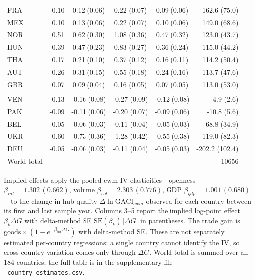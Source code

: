 \begin{table}[t]
\begin{threeparttable}
\begin{tabular}{lrcccr}
FRA & 0.10 & 0.12 (0.06) & 0.22 (0.07) & 0.09 (0.06) & 162.6 (75.0) \\
MEX & 0.10 & 0.13 (0.06) & 0.22 (0.07) & 0.10 (0.06) & 149.0 (68.6) \\
NOR & 0.51 & 0.62 (0.30) & 1.08 (0.36) & 0.47 (0.32) & 123.0 (43.7) \\
HUN & 0.39 & 0.47 (0.23) & 0.83 (0.27) & 0.36 (0.24) & 115.0 (44.2) \\
THA & 0.17 & 0.21 (0.10) & 0.37 (0.12) & 0.16 (0.11) & 114.2 (50.4) \\
AUT & 0.26 & 0.31 (0.15) & 0.55 (0.18) & 0.24 (0.16) & 113.7 (47.6) \\
GBR & 0.07 & 0.09 (0.04) & 0.16 (0.05) & 0.07 (0.05) & 113.0 (53.0) \\
\addlinespace
\multicolumn{6}{l}{\emph{Connectivity decliners (bottom 5)}}\\
VEN & -0.13 & -0.16 (0.08) & -0.27 (0.09) & -0.12 (0.08) & -4.9 (2.6) \\
PAK & -0.09 & -0.11 (0.06) & -0.20 (0.07) & -0.09 (0.06) & -10.8 (5.6) \\
BEL & -0.05 & -0.06 (0.03) & -0.11 (0.04) & -0.05 (0.03) & -68.8 (34.9) \\
UKR & -0.60 & -0.73 (0.36) & -1.28 (0.42) & -0.55 (0.38) & -119.0 (82.3) \\
DEU & -0.05 & -0.06 (0.03) & -0.11 (0.04) & -0.05 (0.03) & -202.2 (102.4) \\
\midrule
World total & --- & --- & --- & --- & 10656 \\
\bottomrule
\end{tabular}
\begin{tablenotes}\scriptsize
\item Implied effects apply the pooled cwm IV elasticities---openness $\beta_{int}=1.302\,(0.662)$, volume $\beta_{vol}=2.303\,(0.776)$, GDP $\beta_{gdp}=1.001\,(0.680)$---to the change in hub quality $\Delta\ln\mathrm{GACI}_{cwm}$ observed for each country between its first and last sample year. Columns 3--5 report the implied log-point effect $\beta_k\Delta G$ with delta-method SE $\mathrm{SE}(\beta_k)\,|\Delta G|$ in parentheses. The trade gain is $\text{goods}\times(1-e^{-\beta_{int}\Delta G})$ with delta-method SE. These are not separately estimated per-country regressions: a single country cannot identify the IV, so cross-country variation comes only through $\Delta G$. World total is summed over all 184 countries; the full table is in the supplementary file \texttt{\_country\_estimates.csv}.
\end{tablenotes}
\end{threeparttable}
\end{table}